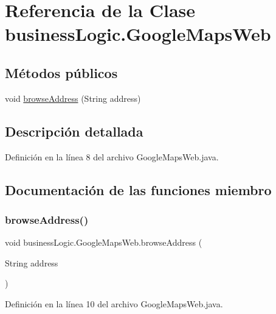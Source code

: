 \hypertarget{classbusiness_logic_1_1_google_maps_web}{}\section{Referencia de la Clase business\+Logic.\+Google\+Maps\+Web}
\label{classbusiness_logic_1_1_google_maps_web}
\subsection*{Métodos públicos}
\begin{DoxyCompactItemize}
\item 
void \mbox{\hyperlink{classbusiness_logic_1_1_google_maps_web_a1e7bc23fa58751707e425caba2eea1b4}{browse\+Address}} (String address)
\end{DoxyCompactItemize}


\subsection{Descripción detallada}


Definición en la línea 8 del archivo Google\+Maps\+Web.\+java.



\subsection{Documentación de las funciones miembro}
\mbox{\label{classbusiness_logic_1_1_google_maps_web_a1e7bc23fa58751707e425caba2eea1b4}} 
\subsubsection{\texorpdfstring{browseAddress()}{browseAddress()}}
{\footnotesize\ttfamily void business\+Logic.\+Google\+Maps\+Web.\+browse\+Address (\begin{DoxyParamCaption}\item[{String}]{address }\end{DoxyParamCaption})}



Definición en la línea 10 del archivo Google\+Maps\+Web.\+java.



